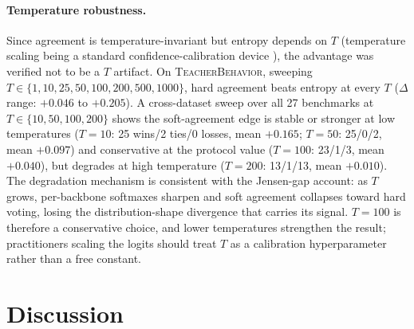 \documentclass[a4paper,fleqn]{cas-sc}
\newcommand{\tb}{\textsc{TeacherBehavior}}
\begin{document}
\paragraph{Temperature robustness.}
\label{sec:temperature}
Since agreement is temperature-invariant but entropy depends on $T$ (temperature scaling being a standard confidence-calibration device \citep{guo2017temperature}), the advantage was verified not to be a $T$ artifact.
On \tb, sweeping $T \in \{1, 10, 25, 50, 100, 200, 500, 1000\}$, hard agreement beats entropy at every $T$ ($\Delta$ range: $+0.046$ to $+0.205$).
A cross-dataset sweep over all 27 benchmarks at $T \in \{10, 50, 100, 200\}$ shows the soft-agreement edge is stable or stronger at low temperatures ($T{=}10$: 25 wins/2 ties/0 losses, mean $+0.165$; $T{=}50$: 25/0/2, mean $+0.097$) and conservative at the protocol value ($T{=}100$: 23/1/3, mean $+0.040$), but degrades at high temperature ($T{=}200$: 13/1/13, mean $+0.010$).
The degradation mechanism is consistent with the Jensen-gap account: as $T$ grows, per-backbone softmaxes sharpen and soft agreement collapses toward hard voting, losing the distribution-shape divergence that carries its signal.
$T{=}100$ is therefore a conservative choice, and lower temperatures strengthen the result; practitioners scaling the logits should treat $T$ as a calibration hyperparameter \citep{guo2017temperature} rather than a free constant.

\section{Discussion}
\end{document}
